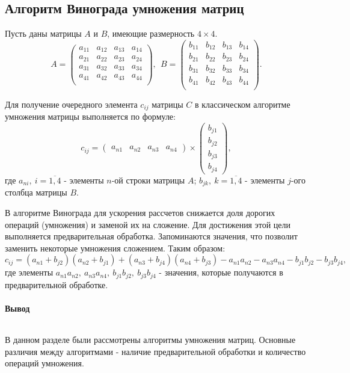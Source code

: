 \subsection{Алгоритм Винограда умножения матриц}

Пусть даны матрицы $A$ и  $B$, имеющие размерность  $4\times 4$.
\begin{equation}
    A = 
\begin{pmatrix}
    a_{11} & a_{12} & a_{13} & a_{14} \\
    a_{21} & a_{22} & a_{23} & a_{24} \\
    a_{31} & a_{32} & a_{33} & a_{34} \\
    a_{41} & a_{42} & a_{43} & a_{44} \\
\end{pmatrix}, \ \
    B = 
\begin{pmatrix}
    b_{11} & b_{12} & b_{13} & b_{14} \\
    b_{21} & b_{22} & b_{23} & b_{24} \\
    b_{31} & b_{32} & b_{33} & b_{34} \\
    b_{41} & b_{42} & b_{43} & b_{44} \\
\end{pmatrix}.
\end{equation}

Для получение очередного элемента $c_{ij}$ матрицы $C$ в классическом
алгоритме умножения матрицы выполняется по формуле:
\begin{equation}
    c_{ij} = \begin{pmatrix} a_{n1} & a_{n2} & a_{n3} & a_{n4} \end{pmatrix} 
    \times 
    \begin{pmatrix} b_{j1}\\ b_{j2}\\ b_{j3}\\ b_{j4} \end{pmatrix},
\end{equation}
где $a_{ni}, \ i = \overline{1,4}$ - элементы $n$-ой строки матрицы  $A$;
$b_{jk}, \ k = \overline{1,4}$ - элементы $j$-ого столбца матрицы  $B$.

В алгоритме Винограда для ускорения рассчетов снижается доля дорогих операций (умножения) и
заменой их на сложение. Для достижения этой цели выполняется предварительная обработка.
Запоминаются значения, что позволит заменить некоторые умножения сложением. Таким
образом:
\begin{equation}
    c_{ij} = (a_{n1} + b_{j2}) (a_{n2} + b_{j1})
    + (a_{n3} + b_{j4})(a_{n4} + b_{j 3})
    - a_{n 1}a_{n 2} - a_{n 3}a_{n 4} - b_{j 1}b_{j 2} - b_{j 3}b_{j 4},
\end{equation}
где элементы $a_{n 1}a_{n 2}, \ a_{n 3}a_{n 4}, \ b_{j 1}b_{j 2}, \ b_{j 3}b_{j 4}$ - значения,
которые получаются в предварительной обработке.

\paragraph*{Вывод} ${}$ \newline

В данном разделе были рассмотрены алгоритмы умножения матриц. Основные различия между
алгоритмами - наличие предварительной обработки и количество операций умножения.


